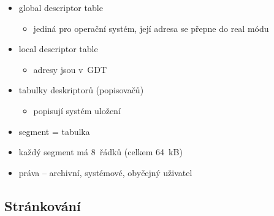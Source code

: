\documentclass[a4paper,12pt]{article}
\providecommand{\tightlist}{%
\setlength{\itemsep}{0pt}\setlength{\parskip}{0pt}}
\begin{document}
\begin{itemize}
\tightlist
\item global descriptor table

  \begin{itemize}
  \tightlist
  \item jediná pro operační systém, její adresa se přepne do real módu
  \end{itemize}
\item local descriptor table

  \begin{itemize}
  \tightlist
  \item adresy jsou v~GDT
  \end{itemize}
\item tabulky deskriptorů (popisovačů)

  \begin{itemize}
  \tightlist
  \item popisují systém uložení
  \end{itemize}
\item segment = tabulka
\item každý segment má 8~řádků (celkem 64~kB)
\item práva -- archivní, systémové, obyčejný uživatel
\end{itemize}

\subsection{Stránkování}
\end{document}
